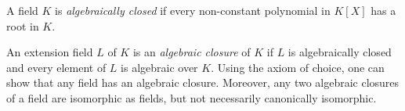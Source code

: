 \documentclass{article}
\begin{document}
A field $K$ is \emph{algebraically closed} if every non-constant polynomial in $K[X]$ has a root in $K$.

An extension field $L$ of $K$ is an \emph{algebraic closure} of $K$ if $L$ is algebraically closed and every element of $L$ is algebraic over $K$.  Using the axiom of choice, one can show that any field has an algebraic closure.  Moreover, any two algebraic closures of a field are isomorphic as fields, but not necessarily canonically isomorphic.
\end{document}

